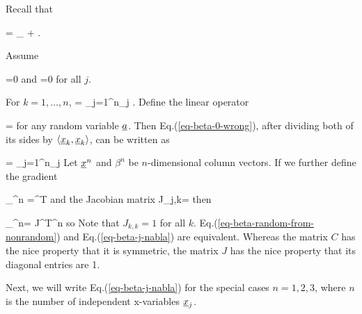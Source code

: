 Recall that

\beq
\rvy =
_{\HAT{\rvy}}
+\ul{\eps}
\;.
\eeq


Assume

\beq
\av{\rveps}=0
\eeq
and
\beq
{}=0
\eeq
for all $j$.

For $k=1, \ldots, n$,
\beq
{}
=
\sum_{j=1}^{n}\beta_j
\;.
\label{eq-beta-0-wrong}
\eeq
Define
the linear operator

\beq
\pder{\cdot}{\rva}=
\frac{\av{\rva, \cdot}}
{\av{\rva, \rva}}
\eeq
for any random variable ${\underline{a}}$.
Then Eq.(\ref{eq-beta-0-wrong}),
after dividing both
of its sides by $\left\langle{\underline{x}}_k, {\underline{x}}_k\right\rangle$,
can be written as

\beq
{}=
\sum_{j=1}^n\beta_j
\eeq
Let ${\underline{x}}^n$ and $\beta^n$ be
$n$-dimensional column vectors.
If we further define
the gradient

\beq
\nabla_{\rvx^n}\rvy
=^T
\eeq
and the Jacobian matrix
\beq
J_{j,k}=
\eeq
then

\beq
\nabla_{\rvx^n}\rvy=
J^T\beta^n
\eeq
so
\beq
{}
\label{eq-beta-j-nabla}
\eeq
Note that $J_{k,k}=1$ for all $k$.
Eq.(\ref{eq-beta-random-from-nonrandom})
and
Eq.(\ref{eq-beta-j-nabla})
are equivalent. Whereas the matrix 
$C$ has the nice property
that it is symmetric,
the matrix $J$  has the nice
property that its diagonal
entries are 1.


Next, we will
write
 Eq.(\ref{eq-beta-j-nabla})
for the special cases
$n=1,2,3$,
where $n$ is the
number of independent x-variables ${\underline{x}}_j$.

